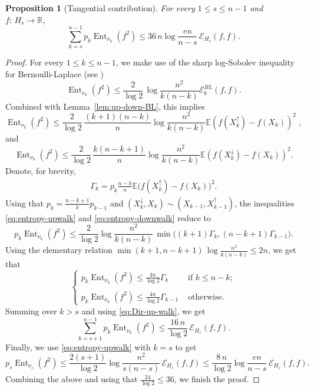 \documentclass[12pt,final]{amsart}
\newcommand{\1}{\mathbf{1}}
\newtheorem{proposition}[theorem]{Proposition}
\newcommand{\Ent}{\operatorname{Ent}}
\newcommand{\Ecal}{\mathcal{E}}
\newcommand{\R}{\mathbb{R}}
\begin{document}
\begin{proposition}[Tangential contribution]\label{prop:tangential-contribution}
    For every $1\leq s\leq n-1$ and $f:\, H_s\to \R$,
    $$
    \sum_{k= s}^{n-1} p_k\Ent_{\nu_k}(f^2)\leq 36\,n \log \frac{en}{n-s}\, \Ecal_{H_s}(f,f). 
    $$
\end{proposition}
\begin{proof}
For every $1\leq k\leq n-1$, we make use of the sharp log-Sobolev inequality for Bernoulli-Laplace (see \cite[Theorem~5]{LeeYau})
    $$
    \Ent_{\nu_k}(f^2)\leq \frac{2}{\log 2} \,\log \frac{n^2}{k(n-k)} \Ecal_{k}^{BL}(f,f).
    $$
   Combined with Lemma~\ref{lem:up-down-BL}, this implies   
   \begin{equation}\label{eq:entropy-upwalk}
       \Ent_{\nu_k}(f^2)\leq \frac{2}{\log 2} \, \frac{(k+1)(n-k)}{n}\log \frac{n^2}{k(n-k)} \mathbb{E}{(f(X^{\uparrow}_k)-f(X_k))^2}\;,
   \end{equation}
    and 
      \begin{equation}\label{eq:entropy-downwalk}
    \Ent_{\nu_k}(f^2)\leq \frac{2}{\log 2} \, \frac{k(n-k+1)}{n}\log \frac{n^2}{k(n-k)} \mathbb{E}{(f(X^{\downarrow}_k)-f(X_k))^2}.
   \end{equation}
Denote, for brevity, 
\begin{align*}
    \Gamma_k=p_k\frac{n-k}{n}\mathbb{E}{\bigl(f(X^\uparrow_k)-f(X_k)\bigr)^2}.
\end{align*}
Using that $p_k=\frac{n-k+1}{k} p_{k-1}$ and $(X_k^{\downarrow}, X_k)\sim (X_{k-1},X_{k-1}^{\uparrow})$, the inequalities \eqref{eq:entropy-upwalk} and \eqref{eq:entropy-downwalk} reduce to 
$$
p_k\Ent_{\nu_k}(f^2)\leq \frac{2}{\log 2} \log \frac{n^2}{k(n-k)} \, \min\big((k+1)\Gamma_{k}, (n-k+1)\Gamma_{k-1}\big).
$$
Using the elementary relation $\min (k+1, n-k+1)\, \log \frac{n^2}{k(n-k)}\leq 2n$, we get that 
$$
\begin{cases}
    p_k\Ent_{\nu_k}(f^2)\leq \frac{4n}{\log 2} \Gamma_{k}  & \text{ if } k\leq n-k;\\
    & \\
     p_k\Ent_{\nu_k}(f^2)\leq \frac{4n}{\log 2} \Gamma_{k-1}  & \text{ otherwise.}
\end{cases}
$$
Summing over $k> s$ and using \eqref{eq:Dir-up-walk}, we get 
$$
\sum_{k=s+1}^{n-1} p_k\Ent_{\nu_k}(f^2)\leq \frac{16\,n}{\log 2}\, \Ecal_{H_s}(f,f).
$$
Finally, we use \eqref{eq:entropy-upwalk} with $k=s$ to get
$$
p_s\Ent_{\nu_s}(f^2)\leq \frac{2(s+1)}{\log 2} \log \frac{n^2}{s(n-s)} \, \Ecal_{H_s}(f,f)\leq \frac{8\,n}{\log 2} \log \frac{en}{n-s}\, \Ecal_{H_s}(f,f). 
$$
Combining the above and using that $\frac{24}{\log 2}\leq 36$, we finish the proof. 
\end{proof}
\end{document}
